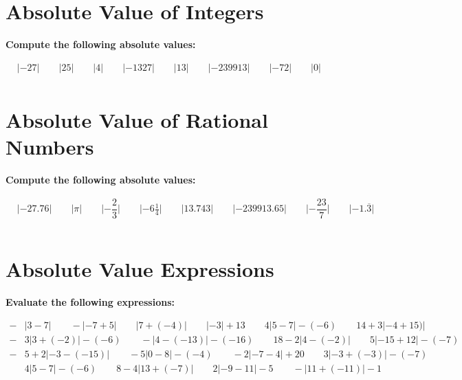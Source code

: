 \documentclass{article}
\begin{document}
\section{Absolute Value of Integers}

\textbf{Compute the following absolute values:}

\bigskip

\(\begin{aligned}
	&\lvert-27\rvert \qquad \lvert25\rvert \qquad \lvert4\rvert \qquad \lvert-1327\rvert \qquad
	\lvert13\rvert \qquad \lvert-239913\rvert \qquad \lvert-72\rvert \qquad \lvert0\rvert\\[2em]
\end{aligned}\)

\section{Absolute Value of Rational Numbers}

\textbf{Compute the following absolute values:}

\bigskip

\(\begin{aligned}
	&\lvert-27.76\rvert \qquad \lvert\pi\rvert \qquad \lvert-\dfrac{2}{3}\rvert \qquad \lvert -6\frac{1}{4}\rvert \qquad
	\lvert13.743\rvert \qquad \lvert-239913.65\rvert \qquad \lvert-\dfrac{23}{7}\rvert \qquad \lvert-1.\overline3\rvert\\\\
\end{aligned}\)

\section{Absolute Value Expressions}

\textbf{Evaluate the following expressions:}

\bigskip

\(\begin{aligned}
	-&\lvert3-7\rvert \qquad -\lvert-7+5\rvert \qquad \lvert7+(-4)\rvert \qquad \lvert-3\rvert+13 \qquad 4\lvert5-7\rvert-(-6) \qquad 14+3\lvert-4+15)\rvert\\[2em]
	-&3\lvert3+(-2)\rvert-(-6) \qquad -\lvert4-(-13)\rvert-(-16) \qquad 18-2\lvert4-(-2)\rvert \qquad 5\lvert-15+12\rvert-(-7)\\[2em]
	-&5+2\lvert-3-(-15)\rvert \qquad -5\lvert0-8\rvert-(-4) \qquad -2\lvert-7-4\rvert+20 \qquad 3\lvert-3+(-3)\rvert-(-7)\\[2em]
	&4\lvert5-7\rvert-(-6) \qquad 8-4\lvert13+(-7)\rvert \qquad 2\lvert-9-11\rvert-5 \qquad -\lvert11+(-11)\rvert-1\\\\
\end{aligned}\)
\newpage
\end{document}
